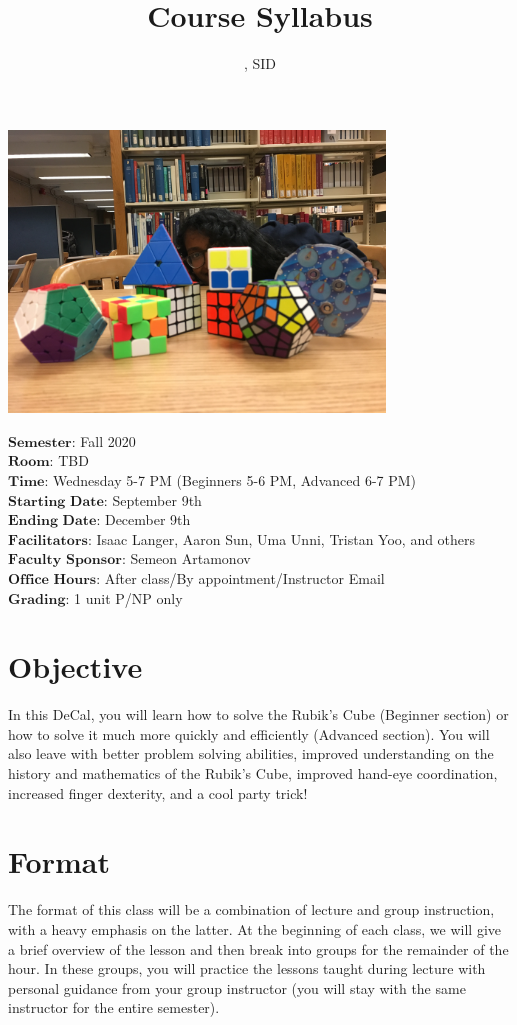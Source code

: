 \documentclass[11pt]{article}
\author{\Name, SID \SID}
\date{}
\begin{document}
\maketitle
\title{Course Syllabus}
\centerline{\includegraphics[width=10cm]{5.JPG}}

$\textbf{Semester}$: Fall 2020\\
$\textbf{Room}$: TBD\\
$\textbf{Time}$: Wednesday 5-7 PM (Beginners 5-6 PM, Advanced 6-7 PM)\\
$\textbf{Starting Date}$: September 9th\\
$\textbf{Ending Date}$: December 9th\\
$\textbf{Facilitators}$: Isaac Langer, Aaron Sun, Uma Unni, Tristan Yoo, and others\\
$\textbf{Faculty Sponsor}$: Semeon Artamonov\\
$\textbf{Office Hours}$: After class/By appointment/Instructor Email \\
$\textbf{Grading}$: 1 unit P/NP only

\section*{Objective}
In this DeCal, you will learn how to solve the Rubik’s Cube (Beginner section) or how to solve it much more quickly and efficiently (Advanced section). You will also leave with better problem solving abilities, improved understanding on the history and mathematics of the Rubik’s Cube, improved hand-eye coordination, increased finger dexterity, and a cool party trick!


\section*{Format}
The format of this class will be a combination of lecture and group instruction, with a heavy emphasis on the latter. At the beginning of each class, we will give a brief overview of the lesson and then break into groups for the remainder of the hour. In these groups, you will practice the lessons taught during lecture with personal guidance from your group instructor (you will stay with the same instructor for the entire semester).
\end{document}

